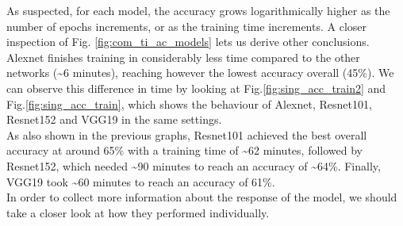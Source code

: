As suspected, for each model, the accuracy grows logarithmically higher as the number of  epochs increments, or as the training time increments. A closer inspection of Fig. \ref{fig:com_ti_ac_models} lets us derive other conclusions. Alexnet finishes training in considerably less time compared to the other networks (\textasciitilde 6 minutes), reaching however the lowest accuracy overall (45\%). We can observe this difference in time by looking at Fig.\ref{fig:sing_acc_train2} and Fig.\ref{fig:sing_acc_train}, which shows the behaviour of Alexnet, Resnet101, Resnet152 and VGG19 in the same settings. \\
As also shown in the previous graphs, Resnet101 achieved the best overall accuracy at around 65\% with a training time of \textasciitilde 62 minutes, followed by Resnet152, which needed  \textasciitilde 90 minutes to reach an accuracy of \textasciitilde 64\%. Finally, VGG19 took \textasciitilde 60 minutes to reach an accuracy of 61\%. \\
In order to collect more information about the response of the model, we should take a closer look at how they performed individually.\\

